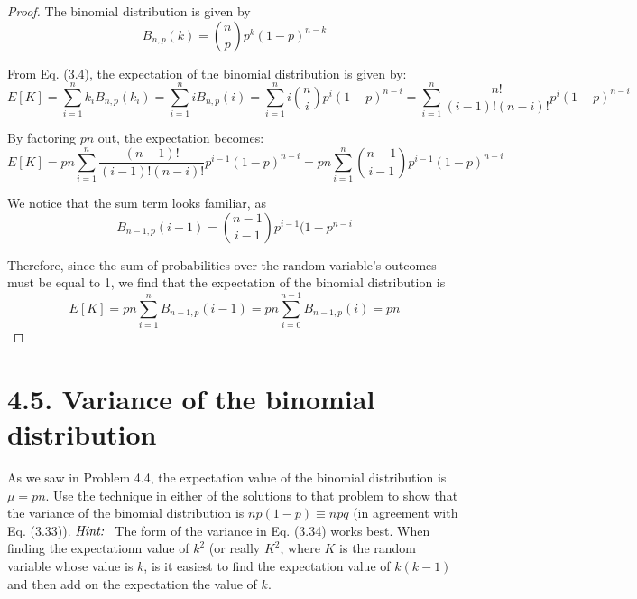 \begin{proof}
    The binomial distribution is given by
    \begin{equation*}\tag{4.7}
        B_{n, p}(k) = \binom{n}{p}p^k (1 - p)^{n - k}
    \end{equation*}

    From Eq. (3.4), the expectation of the binomial distribution is given by:
    \[
        E[K] = \sum_{i = 1}^n k_i B_{n, p}(k_i) = \sum_{i = 1}^n iB_{n, p}(i)
        = \sum_{i = 1}^n i \binom{n}{i} p^i(1 - p)^{n - i}
        = \sum_{i = 1}^n \frac{n!}{(i - 1)! (n - i)!} p^i(1 - p)^{n - i}
    \] 

    By factoring $pn$ out, the expectation becomes:
    \[
        E[K] = pn \sum_{i = 1}^n \frac{(n - 1)!}{(i - 1)! (n - i)!} p^{i - 1}(1 - p)^{n - i}
        = pn \sum_{i = 1}^n \binom{n - 1}{i - 1} p^{i - 1}(1 - p)^{n - i}
    \] 

    We notice that the sum term looks familiar, as
    \[
        B_{n - 1, p}(i - 1) = \binom{n - 1}{i - 1} p^{i - 1}(1 - p^{n - i}
    \] 

    Therefore, since the sum of probabilities over the random variable's outcomes must be equal to 1,
    we find that the expectation of the binomial distribution is 
    \[
        E[K] = pn \sum_{i = 1}^n B_{n - 1, p}(i - 1) = pn \sum_{i = 0}^{n - 1} B_{n - 1, p}(i) = pn
    \] 
\end{proof}

\section*{4.5. Variance of the binomial distribution}
As we saw in Problem 4.4, the expectation value of the binomial distribution
is $\mu = pn$. Use the technique in either of the solutions to that problem
to show that the variance of the binomial distribution is  $np(1 - p) \equiv npq$
(in agreement with Eq. (3.33)). $\emph{Hint: }$ The form of the variance in 
Eq. (3.34) works best. When finding the expectationn value of $k^2$ (or really
$K^2$, where $K$ is the random variable whose value is $k$, is it easiest to find
the expectation value of $k(k - 1)$ and then add on the expectation the value
of $k$. 

\vspace{1em}

